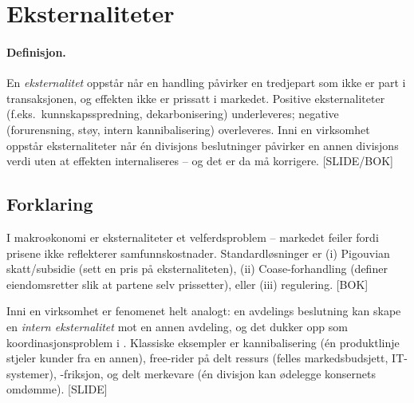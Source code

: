 \section{Eksternaliteter}\label{thr:externalities}

\paragraph{Definisjon.} En \emph{eksternalitet} oppstår når en handling påvirker en tredjepart som ikke er part i transaksjonen, og effekten ikke er prissatt i markedet. Positive eksternaliteter (f.eks.\ kunnskapsspredning, dekarbonisering) underleveres; negative (forurensning, støy, intern kannibalisering) overleveres. Inni en virksomhet oppstår eksternaliteter når én divisjons beslutninger påvirker en annen divisjons verdi uten at effekten internaliseres -- og det er da  må korrigere. [SLIDE/BOK]

\subsection*{Forklaring}

I makro\o konomi er eksternaliteter et velferdsproblem -- markedet feiler fordi prisene ikke reflekterer samfunnskostnader. Standardløsninger er (i) Pigouvian skatt/subsidie (sett en pris på eksternaliteten), (ii) Coase-forhandling (definer eiendomsretter slik at partene selv prissetter), eller (iii) regulering. [BOK]

Inni en virksomhet er fenomenet helt analogt: en avdelings beslutning kan skape en \emph{intern eksternalitet} mot en annen avdeling, og det dukker opp som koordinasjonsproblem i . Klassiske eksempler er kannibalisering (én produktlinje stjeler kunder fra en annen), free-rider på delt ressurs (felles markedsbudsjett, IT-systemer), -friksjon, og delt merkevare (én divisjon kan ødelegge konsernets omdømme). [SLIDE]

